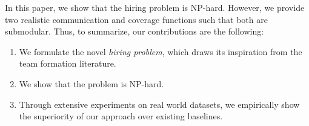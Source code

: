 In this paper, we show that the hiring problem is NP-hard.
However, we provide two realistic communication and coverage functions such that both are submodular.
Thus, to summarize, our contributions are the following:

\begin{enumerate}
\item We formulate the novel \textit{hiring problem}, which draws its inspiration from the team formation literature.

\item We show that the problem is NP-hard. 


\item Through extensive experiments on real world datasets, we empirically show the superiority of our approach over existing baselines. 

\end{enumerate}